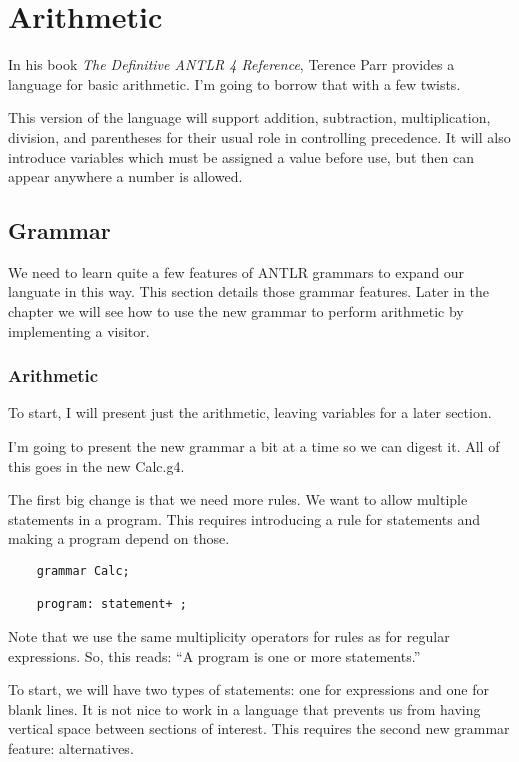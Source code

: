 \chapter{Arithmetic}

In his book {\it The Definitive ANTLR 4 Reference}, Terence Parr
provides a language for basic arithmetic. I'm going to borrow that
with a few twists.

This version of the language will support addition, subtraction,
multiplication, division, and parentheses for their usual role in
controlling precedence. It will also introduce variables which must
be assigned a value before use, but then can appear anywhere a number
is allowed.

\section{Grammar}

We need to learn quite a few features of ANTLR grammars to expand our
languate in this way. This section details those grammar features.
Later in the chapter we will see how to use the new grammar to perform
arithmetic by implementing a visitor.

\subsection{Arithmetic}

To start, I will present just the arithmetic, leaving variables for
a later section.

I'm going to present the new grammar a bit at a time so we can digest it.
All of this goes in the new Calc.g4.

The first big change is that we need more rules. We want to allow
multiple statements in a program. This requires introducing a rule
for statements and making a program depend on those.

{\footnotesize
\begin{verbatim}
    grammar Calc;

    program: statement+ ;
\end{verbatim}
}

Note that we use the same multiplicity operators for rules as
for regular expressions. So, this reads: ``A program is one or
more statements.''

To start, we will have two types of statements: one for expressions
and one for blank lines. It is not nice to work in a language that
prevents us from having vertical space between sections of interest.
This requires the second new grammar feature: alternatives.


